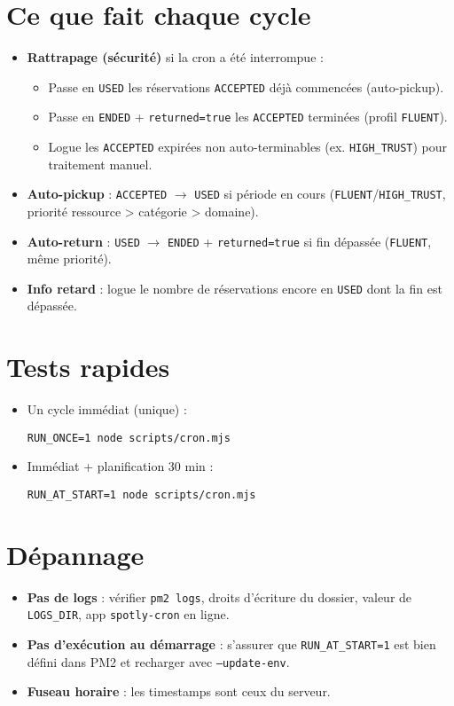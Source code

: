 \documentclass{article}
\begin{document}
\section*{Ce que fait chaque cycle}
\begin{itemize}[leftmargin=1.2em]
  \item \textbf{Rattrapage (sécurité)} si la cron a été interrompue :
  \begin{itemize}
    \item Passe en \texttt{USED} les réservations \texttt{ACCEPTED} déjà commencées (auto-pickup).
    \item Passe en \texttt{ENDED} + \texttt{returned=true} les \texttt{ACCEPTED} terminées (profil \texttt{FLUENT}).
    \item Logue les \texttt{ACCEPTED} expirées non auto-terminables (ex. \texttt{HIGH\_TRUST}) pour traitement manuel.
  \end{itemize}
  \item \textbf{Auto-pickup} : \texttt{ACCEPTED} \(\rightarrow\) \texttt{USED} si période en cours (\texttt{FLUENT}/\texttt{HIGH\_TRUST}, priorité ressource > catégorie > domaine).
  \item \textbf{Auto-return} : \texttt{USED} \(\rightarrow\) \texttt{ENDED} + \texttt{returned=true} si fin dépassée (\texttt{FLUENT}, même priorité).
  \item \textbf{Info retard} : logue le nombre de réservations encore en \texttt{USED} dont la fin est dépassée.
\end{itemize}


\section*{Tests rapides}
\begin{itemize}[leftmargin=1.2em]
  \item Un cycle immédiat (unique) :
\begin{verbatim}
RUN_ONCE=1 node scripts/cron.mjs
\end{verbatim}
  \item Immédiat + planification 30 min :
\begin{verbatim}
RUN_AT_START=1 node scripts/cron.mjs
\end{verbatim}
\end{itemize}

\section*{Dépannage}
\begin{itemize}[leftmargin=1.2em]
  \item \textbf{Pas de logs} : vérifier \texttt{pm2 logs}, droits d'écriture du dossier, valeur de \texttt{LOGS\_DIR}, app \texttt{spotly-cron} en ligne.
  \item \textbf{Pas d'exécution au démarrage} : s'assurer que \texttt{RUN\_AT\_START=1} est bien défini dans PM2 et recharger avec \texttt{--update-env}.
  \item \textbf{Fuseau horaire} : les timestamps sont ceux du serveur.
\end{itemize}
\end{document}
